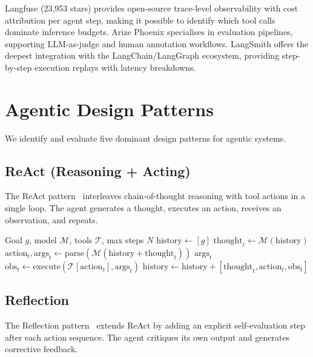 \documentclass[12pt, a4paper]{article}
\begin{document}
Langfuse (23,953 stars) provides open-source trace-level observability with cost attribution per agent step, making it possible to identify which tool calls dominate inference budgets. Arize Phoenix specialises in evaluation pipelines, supporting LLM-as-judge and human annotation workflows. LangSmith offers the deepest integration with the LangChain/LangGraph ecosystem, providing step-by-step execution replays with latency breakdowns.

\section{Agentic Design Patterns}\label{sec:patterns}

We identify and evaluate five dominant design patterns for agentic systems.

\subsection{ReAct (Reasoning + Acting)}
The ReAct pattern~\citep{yao2023react} interleaves chain-of-thought reasoning with tool actions in a single loop. The agent generates a thought, executes an action, receives an observation, and repeats.

\begin{algorithm}[ht]
\caption{ReAct Agent Loop}
\label{alg:react}
\begin{algorithmic}[1]
\Require Goal $g$, model $\mathcal{M}$, tools $\mathcal{T}$, max steps $N$
\State $\text{history} \gets [g]$
    \State $\text{thought}_t \gets \mathcal{M}(\text{history})$ 
    \State $\text{action}_t, \text{args}_t \gets \text{parse}(\mathcal{M}(\text{history} + \text{thought}_t))$ 
        \State \Return $\text{args}_t$
    \EndIf
    \State $\text{obs}_t \gets \text{execute}(\mathcal{T}[\text{action}_t], \text{args}_t)$
    \State $\text{history} \gets \text{history} + [\text{thought}_t, \text{action}_t, \text{obs}_t]$
\EndFor
\end{algorithmic}
\end{algorithm}

\subsection{Reflection}
The Reflection pattern~\citep{shinn2023reflexion} extends ReAct by adding an explicit self-evaluation step after each action sequence. The agent critiques its own output and generates corrective feedback.
\end{document}

